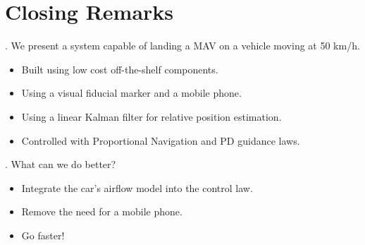 \section{Closing Remarks}

\begin{frame}{\thesection. \insertsection}
	We present a system capable of landing a MAV on a vehicle moving at 50 km/h.
	\begin{itemize}
		\item Built using low cost off-the-shelf components.
		\item Using a visual fiducial marker and a mobile phone.
		\item Using a linear Kalman filter for relative position estimation.
		\item Controlled with Proportional Navigation and PD guidance laws.
	\end{itemize}
\end{frame}


\begin{frame}{\thesection. \insertsection}
	What can we do better?
	\begin{itemize}
		\item Integrate the car's airflow model into the control law.
		\item Remove the need for a mobile phone.
		\item Go faster!
	\end{itemize}
\end{frame}
